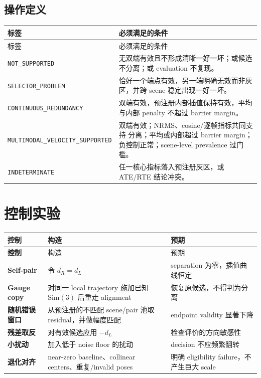 \documentclass[UTF8,a4paper,11pt]{ctexart}
\newcommand{\Sim}{\mathrm{Sim}}
\begin{document}
\subsection{操作定义}

\begin{longtable}{>{\raggedright\arraybackslash}p{4.1cm}
  >{\raggedright\arraybackslash}p{10.4cm}}
  \toprule
  标签 & 必须满足的条件 \\
  \midrule
  \endfirsthead
  \toprule
  标签 & 必须满足的条件 \\
  \midrule
  \endhead
  \texttt{NOT\_SUPPORTED} & 无双端有效且不形成清晰一好一坏；或候选不分离；或
    evaluation 不复现。\\
  \texttt{SELECTOR\_PROBLEM} & 恰好一个端点有效，另一端明确无效而非灰区，并跨 scene
    稳定出现一好一坏。\\
  \texttt{CONTINUOUS\_}\newline\texttt{REDUNDANCY} & 双端有效，预注册内部插值保持有效，平均与内部
    penalty 不超过 barrier margin。\\
  \texttt{MULTIMODAL\_}\newline\texttt{VELOCITY\_}\newline\texttt{SUPPORTED}
    & 双端有效；NRMS、cosine/逐帧指标共同支持
    分离；平均或内部超过 barrier margin；负控制正常；scene-level prevalence 过门槛。\\
  \texttt{INDETERMINATE} & 任一核心指标落入预注册灰区，或 ATE/RTE 结论冲突。\\
  \bottomrule
\end{longtable}

\section{控制实验}

\begin{longtable}{>{\bfseries}p{3.0cm}p{6.0cm}p{5.5cm}}
  \toprule
  控制 & 构造 & 预期 \\
  \midrule
  \endfirsthead
  \toprule
  控制 & 构造 & 预期 \\
  \midrule
  \endhead
  Self-pair & 令 $d_R=d_L$ & separation 为零，插值曲线恒定 \\
  Gauge copy & 对同一 local trajectory 施加已知 $\Sim(3)$ 后重走 alignment
    & 恢复原候选，不得判为分离 \\
  随机错误窗口 & 从预注册的不匹配 scene/pair 池取 residual，并做幅度匹配
    & endpoint validity 显著下降 \\
  残差取反 & 对有效候选应用 $-d_L$ & 检查评价的方向敏感性 \\
  小扰动 & 加入低于 noise floor 的扰动 & decision 不应频繁翻转 \\
  退化对齐 & near-zero baseline、collinear centers、重复/invalid poses
    & 明确 eligibility failure，不产生巨大 scale \\
  \bottomrule
\end{longtable}
\end{document}
